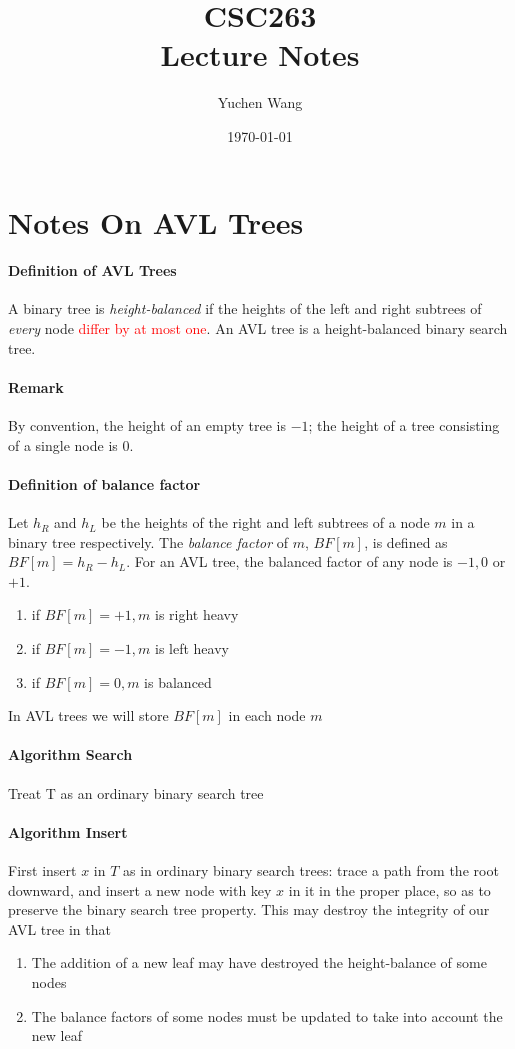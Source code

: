 \documentclass[11pt]{article}
\title{CSC263 \\ Lecture Notes}
\author{Yuchen Wang}
\date{\today}
\newcommand{\ti}[1]{\textit{#1}}
\begin{document}
	\maketitle
	\tableofcontents
	\newpage
	\section{Notes On AVL Trees}
	\paragraph{Definition of AVL Trees} A binary tree is \ti{height-balanced} if the heights of the left and right subtrees of \ti{every} node \textcolor{red}{differ by at most one}. An AVL tree is a height-balanced binary search tree.
	\paragraph{Remark} By convention, the height of an empty tree is $-1$; the height of a tree consisting of a single node is $0$.
	\paragraph{Definition of balance factor} Let $h_R$ and $h_L$ be the heights of the right and left subtrees of a node $m$ in a binary tree respectively. The \ti{balance factor} of $m$, $BF[m]$, is defined as $BF[m] = h_R - h_L$. \newline
	For an AVL tree, the balanced factor of any node is $-1, 0$ or $+1$. \newline
	\begin{enumerate}
		\item if $BF[m] = +1, m$ is right heavy
		\item if $BF[m] = -1, m$ is left heavy
		\item if $BF[m] = 0, m$ is balanced
	\end{enumerate}
	In AVL trees we will store $BF[m]$ in each node $m$
	\paragraph{Algorithm Search}
	Treat T as an ordinary binary search tree
	\paragraph{Algorithm Insert}
	First insert $x$ in $T$ as in ordinary binary search trees: trace a path from the root downward, and insert a new node with key $x$ in it in the proper place, so as to preserve the binary search tree property. This may destroy the integrity of our AVL tree in that 
	\begin{enumerate}
		\item The addition of a new leaf may have destroyed the height-balance of some nodes
		\item The balance factors of some nodes must be updated to take into account the new leaf
	\end{enumerate}
\end{document}
